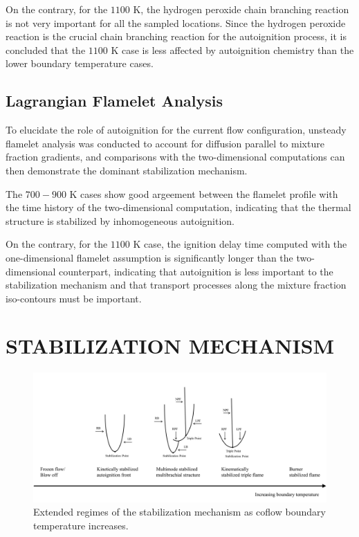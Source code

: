\documentclass[twocolumn,10pt]{hphrc}
\begin{document}
On the contrary, for the $1100$ K, the hydrogen peroxide chain branching reaction is not very important for all the sampled locations.  Since the hydrogen peroxide reaction is the crucial chain branching reaction for the autoignition process, it is concluded that the $1100$ K case is less affected by autoignition chemistry than the lower boundary temperature cases.  

\subsection*{Lagrangian Flamelet Analysis}

To elucidate the role of autoignition for the current flow configuration, unsteady flamelet analysis was conducted to account for diffusion parallel to mixture fraction gradients, and comparisons with the two-dimensional computations can then demonstrate the dominant stabilization mechanism.

The $700-900$ K cases show good argeement between the flamelet profile with the time history of the two-dimensional computation, indicating that the thermal structure is stabilized by inhomogeneous autoignition.  

On the contrary, for the $1100$ K case, the ignition delay time computed with the one-dimensional flamelet assumption is significantly longer than the two-dimensional counterpart, indicating that autoignition is less important to the stabilization mechanism and that transport processes along the mixture fraction iso-contours must be important.

\section*{STABILIZATION MECHANISM}
\begin{figure}
  \centering
  \includegraphics[width=5in]{regime}
  \caption{Extended regimes of the stabilization mechanism as coflow boundary temperature increases.}
  \label{fig:regime}
\end{figure}
\end{document}
